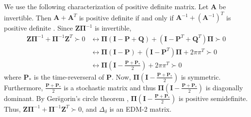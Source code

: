   We use the following characterization of positive definite
  matrix. Let $\mathbf{A}$ be invertible. Then $\mathbf{A} + \mathbf{A}^{T}$ is positive definite if and only if
  $\mathbf{A}^{-1} + (\mathbf{A}^{-1})^{T}$ is positive definite
  \cite{horn94:_topic_in_matrix_analy}. Since $\mathbf{Z}\bm{\Pi}^{-1}$ is
  invertible,
  \begin{equation}
    \label{eq:34}
    \begin{split}
    \mathbf{Z}\bm{\Pi}^{-1} + \bm{\Pi}^{-1}\mathbf{Z}^{T} \succ 0
    & \leftrightarrow \bm{\Pi}(\mathbf{I} - \mathbf{P} + \mathbf{Q}) + (\mathbf{I} -
    \mathbf{P}^{T} + \mathbf{Q}^{T})\bm{\Pi} \succ 0 \\
    & \leftrightarrow \bm{\Pi}(\mathbf{I} - \mathbf{P}) + (\mathbf{I} -
    \mathbf{P}^{T})\bm{\Pi} + 2 \pi \pi^{T} \succ 0 \\
    & \leftrightarrow \bm{\Pi}(\mathbf{I} - \frac{\mathbf{P} + \mathbf{P}_{*}}{2})
    + 2 \pi \pi^{T} \succ 0
  \end{split}      
  \end{equation}
  where $\mathbf{P}_{*}$ is the time-reverseral of $\mathbf{P}$. Now,
  $\bm{\Pi}(\mathbf{I} - \frac{\mathbf{P} + \mathbf{P}_{*}}{2})$ is
  symmetric. Furthermore, $\frac{\mathbf{P} + \mathbf{P}_{*}}{2}$ is a
  stochastic matrix and thus $\bm{\Pi}(\mathbf{I} - \frac{\mathbf{P} +
    \mathbf{P}_{*}}{2})$ is diagonally dominant. By Ger\u{s}gorin's
  circle theorem \cite{gersgorin31:_uber_abgren_eigen_matrix},
  $\bm{\Pi}(\mathbf{I} - \frac{\mathbf{P} + \mathbf{P}_{*}}{2})$ is
  positive semidefinite. Thus, $\mathbf{Z}\bm{\Pi}^{-1} +
  \bm{\Pi}^{-1}\mathbf{Z}^{T} \succ 0$, and $\Delta_{\delta}$ is an
  EDM-2 matrix.
